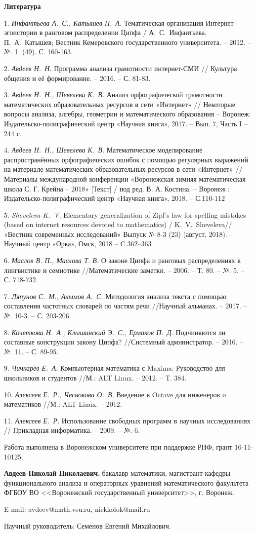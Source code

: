 \documentclass[12pt]{article}
\begin{document}
\bigskip\centerline{\bf Литература}


1.	\emph{Инфантьева А.~С., Катышев П.~А.} Тематическая организация Интернет-эгоистории в ранговом распределении Ципфа / А.~С.~Инфантьева, П.~А.~Катышев; Вестник Кемеровского государственного университета. – 2012. – №. 1. (49). С. 160-163.

2.	\emph{Авдеев Н.~Н.} Программа анализа грамотности интер\-нет\--СМИ // Культура общения и её формирование. – 2016. – С. 81-83.


3.	\emph{ Авдеев Н.~Н., Шевелева К.~В.} Анализ орфографической грамотности
математических образовательных ресурсов в сети «Интернет» // Некоторые вопросы анализа, алгебры, геометрии и математического
образования – Воронеж: Издательско-полиграфический центр «Научная книга», 2017. – Вып. 7, Часть I – 244 с.

4.	\emph{Авдеев Н.~Н., Шевелева К.~В.} Математическое моделирование распространённых орфографических ошибок с помощью регулярных выражений на материале математических образовательных ресурсов в сети «Интернет» // Материалы международной конференции  «Воронежская зимняя математическая школа С. Г. Крейна – 2018» [Текст] / под ред. В. А. Костина. – Воронеж : Издательско-полиграфический центр «Научная книга», 2018. –  С.110-112

5.	\emph{Sheveleva K.~V.} Elementary generalization of Zipf's law for spelling mistakes (based on internet resources devoted to mathematics)  / K.~V.~Sheveleva// «Вестник современных исследований»  Выпуск № 8-3 (23) (август, 2018). --  Научный центр «Орка»,  Омск, 2018 -- C.362--363

6.	\emph{Маслов В. П., Маслова Т. В.} О законе Ципфа и ранговых распределениях в лингвистике и семиотике //Математические заметки. – 2006. – Т. 80. – №. 5. – С. 718-732.

7.  \emph{Ляпунов С.~М., Алымов А.~С.}  Методология анализа текста с помощью составления частотных словарей по частям речи //Научный альманах. – 2017. – №. 10-3. – С. 203-206.

8.	\emph{Кочеткова Н.~А., Клышинский Э.~С., Ермаков П.~Д.} Подчиняются ли составные конструкции закону Ципфа? //Системный администратор. – 2016. – №. 11. – С. 89-95.

9.  \emph{Чичкарёв Е.~А.} Компьютерная математика с Maxima: Руководство для школьников и студентов //М.: ALT Linux. – 2012. – Т. 384.

10. \emph{Алексеев Е.~Р., Чеснокова О.~В.} Введение в Octave для инженеров и математиков //М.: ALT Linux. – 2012.

11. \emph{Алексеев Е.~Р.} Использование свободных программ в научных исследованиях // Прикладная информатика. – 2009. – №. 6.



{\small Работа выполнена в Воронежском университете при поддержке РНФ, грант 16-11-10125.}


{\bf Авдеев Николай Николаевич},
бакалавр математики, магистрант кафедры функционального анализа и операторных уравнений математического факультета
ФГБОУ ВО <<Воронежский государственный университет>>, г. Воронеж.

E-mail: avdeev@math.vsu.ru, nickkolok@mail.ru

Научный руководитель: Семенов Евгений Михайлович.
\end{document}
